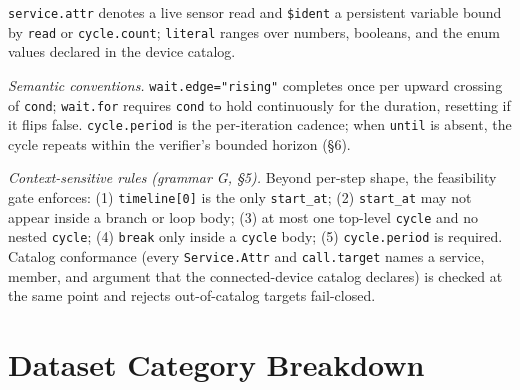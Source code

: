 \documentclass[sigconf,nonacm,anonymous,review]{acmart}
\begin{document}
\noindent\texttt{service.attr} denotes a live sensor read and \texttt{\$}\texttt{ident} a persistent variable bound by \texttt{read} or \texttt{cycle.count}; \texttt{literal} ranges over numbers, booleans, and the enum values declared in the device catalog.

\noindent\emph{Semantic conventions.} \texttt{wait.edge="rising"} completes once per upward crossing of \texttt{cond}; \texttt{wait.for} requires \texttt{cond} to hold continuously for the duration, resetting if it flips false. \texttt{cycle.period} is the per-iteration cadence; when \texttt{until} is absent, the cycle repeats within the verifier's bounded horizon (\S6).

\noindent\emph{Context-sensitive rules (grammar G, \S5).} Beyond per-step shape, the feasibility gate enforces: (1) \texttt{timeline[0]} is the only \texttt{start\_at}; (2) \texttt{start\_at} may not appear inside a branch or loop body; (3) at most one top-level \texttt{cycle} and no nested \texttt{cycle}; (4) \texttt{break} only inside a \texttt{cycle} body; (5) \texttt{cycle.period} is required. Catalog conformance (every \texttt{Service.Attr} and \texttt{call.target} names a service, member, and argument that the connected-device catalog declares) is checked at the same point and rejects out-of-catalog targets fail-closed.

\section{Dataset Category Breakdown}
\label{app:categories}

\end{document}
